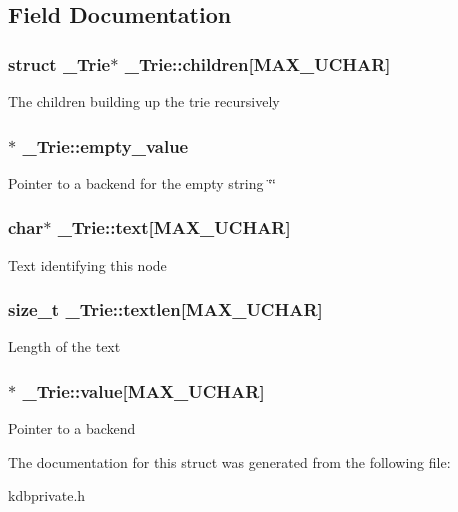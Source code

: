 \subsection{Field Documentation}
\hypertarget{struct__Trie_ae60b70484c5b75a76a9d936c7e6b9370}{
\subsubsection[{children}]{\setlength{\rightskip}{0pt plus 5cm}struct {\bf \_\-Trie}$\ast$ {\bf \_\-Trie::children}\mbox{[}MAX\_\-UCHAR\mbox{]}}}
\label{struct__Trie_ae60b70484c5b75a76a9d936c7e6b9370}
The children building up the trie recursively \hypertarget{struct__Trie_ac5c6b4bddcccb23eb0bd26ffade7eb43}{
\subsubsection[{empty\_\-value}]{$\ast$ {\bf \_\-Trie::empty\_\-value}}}
\label{struct__Trie_ac5c6b4bddcccb23eb0bd26ffade7eb43}
Pointer to a backend for the empty string \char`\"{}\char`\"{} \hypertarget{struct__Trie_af6bc274ad09ef18de2495bdcdf86d54f}{
\subsubsection[{text}]{\setlength{\rightskip}{0pt plus 5cm}char$\ast$ {\bf \_\-Trie::text}\mbox{[}MAX\_\-UCHAR\mbox{]}}}
\label{struct__Trie_af6bc274ad09ef18de2495bdcdf86d54f}
Text identifying this node \hypertarget{struct__Trie_ae1f924ab4e6d8c7eb8064d7eae21bf3f}{
\subsubsection[{textlen}]{\setlength{\rightskip}{0pt plus 5cm}size\_\-t {\bf \_\-Trie::textlen}\mbox{[}MAX\_\-UCHAR\mbox{]}}}
\label{struct__Trie_ae1f924ab4e6d8c7eb8064d7eae21bf3f}
Length of the text \hypertarget{struct__Trie_acc978e56b19aa3c483b4e54755697380}{
\subsubsection[{value}]{$\ast$ {\bf \_\-Trie::value}\mbox{[}MAX\_\-UCHAR\mbox{]}}}
\label{struct__Trie_acc978e56b19aa3c483b4e54755697380}
Pointer to a backend 

The documentation for this struct was generated from the following file:\begin{DoxyCompactItemize}
\item 
kdbprivate.h\end{DoxyCompactItemize}
